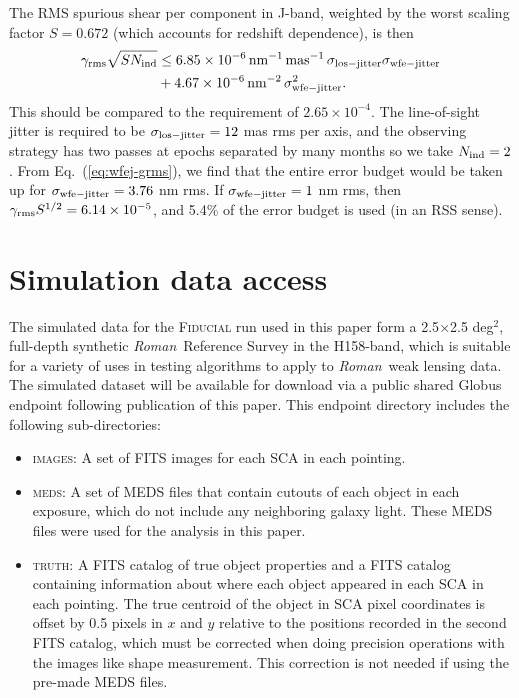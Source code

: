 \documentclass[usenatbib]{mnras}
\newcommand{\wfirst}{{\slshape Roman}}
\begin{document}
The RMS spurious shear per component in J-band, weighted by the worst scaling factor $S = 0.672$ (which accounts for redshift dependence), is then
\begin{align}
\gamma_{\rm rms}\sqrt{S N_{\rm ind}} &\le 6.85\times 10^{-6}\,{\rm
nm}^{-1}\,{\rm mas}^{-1}\,\sigma_{\rm los-jitter}\sigma_{\rm
wfe-jitter} \nonumber\\
&+ 4.67\times 10^{-6} \,{\rm nm}^{-2}\,\sigma_{\rm
wfe-jitter}^2.
\label{eq:wfej-grms}
\end{align}
This should be compared to the requirement of $2.65\times 10^{-4}$. The line-of-sight jitter is required to be $\sigma_{\rm los-jitter}=12$ mas rms per axis, and the observing strategy has two passes at epochs separated by many months so we take $N_{\rm ind}=2$. From Eq.~(\ref{eq:wfej-grms}), we find that the entire error budget would be taken up for $\sigma_{\rm wfe-jitter}=3.76$ nm rms. If $\sigma_{\rm wfe-jitter}=1$ nm rms, then $\gamma_{\rm rms}S^{1/2}=6.14\times 10^{-5}$, and 5.4\% of the error budget is used (in an RSS sense).

\section{Simulation data access}
\label{app:data_access}

The simulated data for the \textsc{Fiducial} run used in this paper form a 2.5$\times$2.5 deg$^2$, full-depth synthetic \wfirst\ Reference Survey in the H158-band, which is suitable for a variety of uses in testing algorithms to apply to \wfirst\ weak lensing data. The simulated dataset will be available for download via a public shared Globus endpoint following publication of this paper. This endpoint directory includes the following sub-directories:

\begin{itemize}
\item \textsc{images}: A set of FITS images for each SCA in each pointing. 
\item \textsc{meds}: A set of MEDS files that contain cutouts of each object in each exposure, which do not include any neighboring galaxy light. These MEDS files were used for the analysis in this paper. 
\item \textsc{truth}: A FITS catalog of true object properties and a FITS catalog containing information about where each object appeared in each SCA in each pointing. The true centroid of the object in SCA pixel coordinates is offset by 0.5 pixels in $x$ and $y$ relative to the positions recorded in the second FITS catalog, which must be corrected when doing precision operations with the images like shape measurement. This correction is not needed if using the pre-made MEDS files.
\end{itemize}
\end{document}
